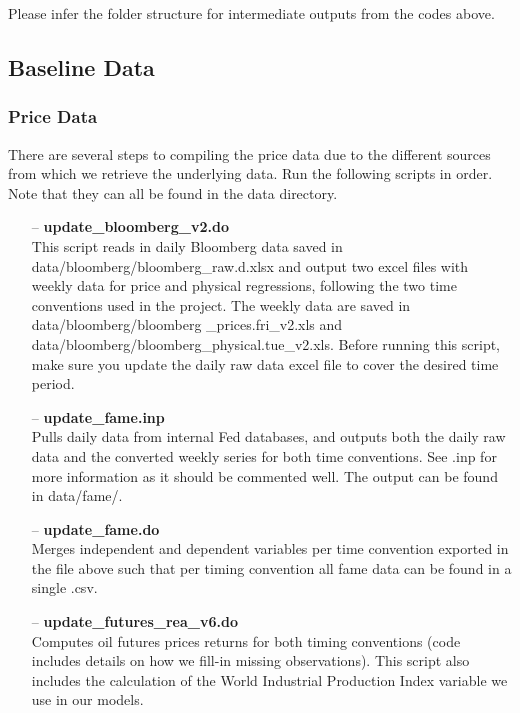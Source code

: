 \documentclass[11pt]{article}
\begin{document}
Please infer the folder structure for intermediate outputs from the codes above.

\subsection{Baseline Data}
\subsubsection{Price Data}
There are several steps to compiling the price data due to the different sources from which we retrieve the underlying data. Run the following scripts in order. Note that they can all be found in the data directory.

\begin{enumerate}
	\item[--] \textbf{update\_bloomberg\_v2.do}\\
	This script reads in daily Bloomberg data saved in data/bloomberg/bloomberg\_raw.d.xlsx and output two excel files with weekly data for price and physical regressions, following the two time conventions used in the project. The weekly data are saved in data/bloomberg/bloomberg \_prices.fri\_v2.xls and data/bloomberg/bloomberg\_physical.tue\_v2.xls. Before running this script, make sure you update the daily raw data excel file to cover the desired time period. 
	
	\item[--]
	\textbf{update\_fame.inp}\\
	Pulls daily data from internal Fed databases, and outputs both the daily raw data and the converted weekly series for both time conventions. See .inp for more information as it should be commented well. The output can be found in data/fame/.
	
	\item[--]
	\textbf{update\_fame.do}\\
	Merges independent and dependent variables per time convention exported in the file above such that per timing convention all fame data can be found in a single .csv. 
	
	\item[--]
	\textbf{update\_futures\_rea\_v6.do}\\
	Computes oil futures prices returns for both timing conventions (code includes details on how we fill-in missing observations). This script also includes the calculation of the World Industrial Production Index variable we use in our models.\\
	

\end{enumerate}
\end{document}
